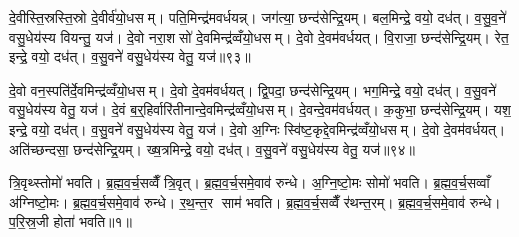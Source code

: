 दे॒वीस्ति॒स्रस्ति॒स्रो दे॒वीर्व॑यो॒धसम्। पति॒मिन्द्र॑मवर्धयन्न्। जग॑त्या॒ छन्द॑सेन्द्रि॒यम्। बल॒मिन्द्रे॒ वयो॒ दध॑त्। व॒सु॒व॒ने॑ वसु॒धेय॑स्य वियन्तु॒ यज॑। दे॒वो नरा॒शसो॑ दे॒वमिन्द्र॑व्वँयो॒धसम्। दे॒वो दे॒वम॑वर्धयत्। वि॒राजा॒ छन्द॑सेन्द्रि॒यम्। रेत॒ इन्द्रे॒ वयो॒ दध॑त्। व॒सु॒वने॑ वसु॒धेय॑स्य वेतु॒ यज॑॥९३॥

दे॒वो वन॒स्पति॑र्दे॒वमिन्द्र॑व्वँयो॒धसम्। दे॒वो दे॒वम॑वर्धयत्। द्वि॒पदा॒ छन्द॑सेन्द्रि॒यम्। भग॒मिन्द्रे॒ वयो॒ दध॑त्। व॒सु॒वने॑ वसु॒धेय॑स्य वेतु॒ यज॑। दे॒वं ब॒र्॒हिर्वारि॑तीनान्दे॒वमिन्द्र॑व्वँयो॒धसम्। दे॒वन्दे॒वम॑वर्धयत्। क॒कुभा॒ छन्द॑सेन्द्रि॒यम्। यश॒ इन्द्रे॒ वयो॒ दध॑त्। व॒सु॒वने॑ वसु॒धेय॑स्य वेतु॒ यज॑। दे॒वो अ॒ग्निः स्वि॑ष्ट॒कृद्दे॒वमिन्द्र॑व्वँयो॒धसम्। दे॒वो दे॒वम॑वर्धयत्। अति॑च्छन्दसा॒ छन्द॑सेन्द्रि॒यम्। ख्ष॒त्रमिन्द्रे॒ वयो॒ दध॑त्। व॒सु॒वने॑ वसु॒धेय॑स्य वेतु॒ यज॑॥९४॥



\clearpage
{}
\setcounter{anuvakam}{0}
त्रि॒वृथ्स्तोमो॑ भवति। ब्र॒ह्म॒व॒र्च॒सव्वैँ त्रि॒वृत्। ब्र॒ह्म॒व॒र्च॒समे॒वाव॑ रुन्धे। अ॒ग्नि॒ष्टो॒मः सोमो॑ भवति। ब्र॒ह्म॒व॒र्च॒सव्वाँ अ॑ग्निष्टो॒मः। ब्र॒ह्म॒व॒र्च॒समे॒वाव॑ रुन्धे। र॒थ॒न्त॒र साम॑ भवति। ब्र॒ह्म॒व॒र्च॒सव्वैँ र॑थन्त॒रम्। ब्र॒ह्म॒व॒र्च॒समे॒वाव॑ रुन्धे। प॒रि॒स्र॒जी होता॑ भवति॥१॥

